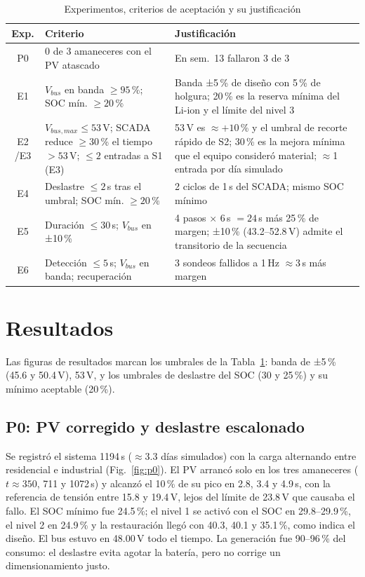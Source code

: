 \documentclass[conference]{IEEEtran}
\begin{document}
\begin{table}[!t]
\caption{Experimentos, criterios de aceptación y su justificación}
\label{tab:crit}
\centering
\scriptsize\setlength{\tabcolsep}{2pt}
\begin{tabular}{|c|p{1.95cm}|p{2.75cm}|}
\hline
\textbf{Exp.} & \textbf{Criterio} & \textbf{Justificación} \\
\hline
P0 & 0 de 3 amaneceres con el PV atascado & En sem.~13 fallaron 3 de 3 \\ \hline
E1 & $V_{bus}$ en banda $\ge95$\,\%; SOC mín. $\ge20$\,\% & Banda ±5\,\% de diseño con 5\,\% de holgura; 20\,\% es la reserva mínima del Li-ion y el límite del nivel 3 \\ \hline
E2 /E3 & $V_{bus,max}\le53$\,V; SCADA reduce $\ge30$\,\% el tiempo $>53$\,V; $\le2$ entradas a S1 (E3) & 53\,V es $\approx+10$\,\% y el umbral de recorte rápido de S2; 30\,\% es la mejora mínima que el equipo consideró material; $\approx$1 entrada por día simulado \\ \hline
E4 & Deslastre $\le2$\,s tras el umbral; SOC mín. $\ge20$\,\% & 2 ciclos de 1\,s del SCADA; mismo SOC mínimo \\ \hline
E5 & Duración $\le30$\,s; $V_{bus}$ en ±10\,\% & 4 pasos $\times$ 6\,s $=24$\,s más 25\,\% de margen; ±10\,\% (43.2--52.8\,V) admite el transitorio de la secuencia \\ \hline
E6 & Detección $\le5$\,s; $V_{bus}$ en banda; recuperación & 3 sondeos fallidos a 1\,Hz $\approx3$\,s más margen \\ \hline
\end{tabular}
\end{table}

\section{Resultados}

Las figuras de resultados marcan los umbrales de la Tabla~\ref{tab:crit}: banda de ±5\,\% (45.6 y 50.4\,V), 53\,V, y los umbrales de deslastre del SOC (30 y 25\,\%) y su mínimo aceptable (20\,\%).

\subsection{P0: PV corregido y deslastre escalonado}
\label{sec:p0}

Se registró el sistema 1194\,s ($\approx$3.3 días simulados) con la carga alternando entre residencial e industrial (Fig.~\ref{fig:p0}). El PV arrancó solo en los tres amaneceres ($t\approx350$, 711 y 1072\,s) y alcanzó el 10\,\% de su pico en 2.8, 3.4 y 4.9\,s, con la referencia de tensión entre 15.8 y 19.4\,V, lejos del límite de 23.8\,V que causaba el fallo. El SOC mínimo fue 24.5\,\%; el nivel 1 se activó con el SOC en 29.8--29.9\,\%, el nivel 2 en 24.9\,\% y la restauración llegó con 40.3, 40.1 y 35.1\,\%, como indica el diseño. El bus estuvo en 48.00\,V todo el tiempo. La generación fue 90--96\,\% del consumo: el deslastre evita agotar la batería, pero no corrige un dimensionamiento justo.
\end{document}
